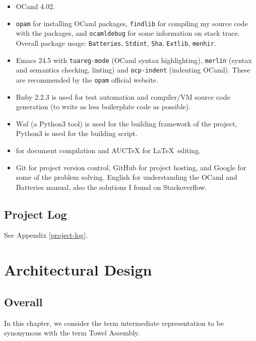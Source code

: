 \documentclass{report}
\begin{document}
\begin{itemize}
\item OCaml 4.02.

\item \texttt{opam} for installing OCaml packages, \texttt{findlib} for compiling my source code with the packages, and \texttt{ocamldebug} for some information on stack trace. Overall package usage: \texttt{Batteries}, \texttt{Stdint}, \texttt{Sha}, \texttt{Extlib}, \texttt{menhir}.

\item Emacs 24.5 with \texttt{tuareg-mode} (OCaml syntax
  highlighting), \texttt{merlin} (syntax and semantics checking,
  linting) and \texttt{ocp-indent} (indenting OCaml). These are
  recommended by the \texttt{opam} official website.

\item Ruby 2.2.3 is used for test automation and compiler/VM source code
  generation (to write as less boilerplate code as possible).

\item Waf (a Python3 tool) is used for the building framework of the
  project, Python3 is used for the building script.

\item \XeTeX{} for document compilation and AUCTeX for \LaTeX ~editing.

\item Git for project version control, GitHub for project hosting, and Google for some of the problem solving. English for understanding the OCaml and Batteries manual, also the solutions I found on Stackoverflow.
\end{itemize}

\section{Project Log}

See Appendix \autoref{project-log}.

\chapter{Architectural Design}

\section{Overall}

In this chapter, we consider the term intermediate representation to be synonymous with the term Towel Assembly.
\end{document}
